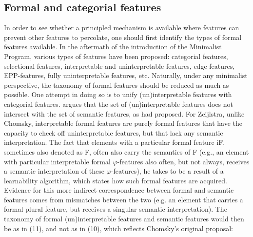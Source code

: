 \documentclass[output=paper
,modfonts
,nonflat]{langsci/langscibook}
\begin{document}
\subsection{Formal and categorial features}
In order to see whether a principled mechanism is available where features can prevent other features to percolate, one should first identify the types of formal features available. In the aftermath of the introduction of the Minimalist Program, various types of features have been proposed: categorial features, selectional features, interpretable and uninterpretable features, edge features, EPP-features, fully uninterpretable features, etc. Naturally, under any minimalist perspective, the taxonomy of formal features should be reduced as much as possible. One attempt in doing so is to unify (un)interpretable features with categorial features. \citet{Zeijlstra2014} argues that the set of (un)interpretable features does not intersect with the set of semantic features, as \citet{Chomsky1995} had proposed. For Zeijlstra, unlike Chomsky, interpretable formal features are purely formal features that have the capacity to check off uninterpretable features, but that lack any semantic interpretation. The fact that elements with a particular formal feature {\lbrack}iF{\rbrack}, sometimes also denoted as {\lbrack}F{\rbrack}, often also carry the semantics of F (e.g., an element with particular interpretable formal $\varphi$-features also often, but not always, receives a semantic interpretation of these $\varphi$-features), he takes to be a result of a learnability algorithm, which states how such formal features are acquired. Evidence for this more indirect correspondence between formal and semantic features comes from mismatches between the two (e.g. an element that carries a formal plural feature, but receives a singular semantic interpretation). The taxonomy of formal (un)interpretable features and semantic features would then be as in (11), and not as in (10), which reflects Chomsky’s original proposal:
\end{document}
